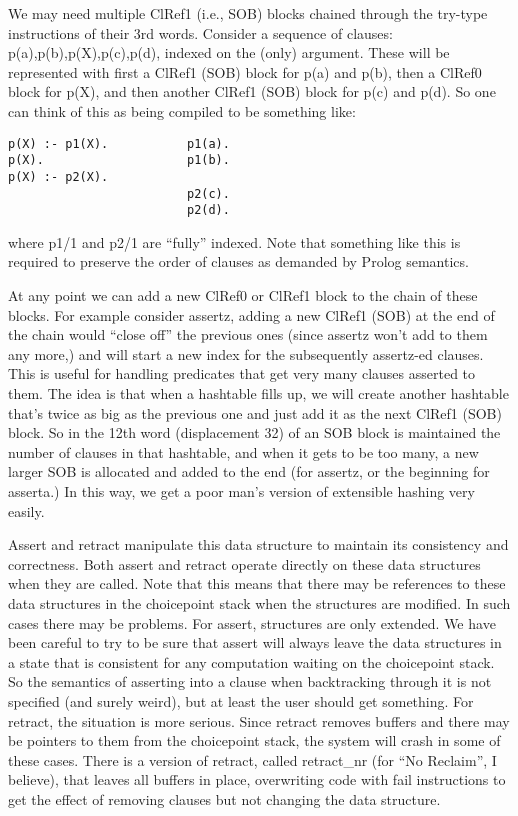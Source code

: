 \documentclass[11pt]{article}
\begin{document}
We may need multiple ClRef1 (i.e., SOB) blocks chained through the
try-type instructions of their 3rd words.  Consider a sequence of
clauses: p(a),p(b),p(X),p(c),p(d), indexed on the (only) argument.
These will be represented with first a ClRef1 (SOB) block for p(a) and
p(b), then a ClRef0 block for p(X), and then another ClRef1 (SOB)
block for p(c) and p(d).  So one can think of this as being compiled
to be something like:
\begin{verbatim}
p(X) :- p1(X).           p1(a).
p(X).                    p1(b).
p(X) :- p2(X).
                         p2(c).
                         p2(d).
\end{verbatim}
where p1/1 and p2/1 are ``fully'' indexed.  Note that something like
this is required to preserve the order of clauses as demanded by Prolog
semantics.

At any point we can add a new ClRef0 or ClRef1 block to the chain of
these blocks.  For example consider assertz, adding a new ClRef1 (SOB)
at the end of the chain would ``close off'' the previous ones (since
assertz won't add to them any more,) and will start a new index for the
subsequently assertz-ed clauses.  This is useful for handling
predicates that get very many clauses asserted to them.  The idea is
that when a hashtable fills up, we will create another hashtable
that's twice as big as the previous one and just add it as the next
ClRef1 (SOB) block.  So in the 12th word (displacement 32) of an SOB
block is maintained the number of clauses in that hashtable, and when
it gets to be too many, a new larger SOB is allocated and added to the
end (for assertz, or the beginning for asserta.)  In this way, we get
a poor man's version of extensible hashing very easily.

Assert and retract manipulate this data structure to maintain its
consistency and correctness.  Both assert and retract operate directly
on these data structures when they are called.  Note that this means
that there may be references to these data structures in the
choicepoint stack when the structures are modified.  In such cases
there may be problems.  For assert, structures are only extended.  We
have been careful to try to be sure that assert will always leave the
data structures in a state that is consistent for any computation
waiting on the choicepoint stack.  So the semantics of asserting into
a clause when backtracking through it is not specified (and surely
weird), but at least the user should get something.  For retract, the
situation is more serious.  Since retract removes buffers and there
may be pointers to them from the choicepoint stack, the system will
crash in some of these cases.  There is a version of retract, called
retract\_nr (for ``No Reclaim'', I believe), that leaves all buffers in
place, overwriting code with fail instructions to get the effect of
removing clauses but not changing the data structure.
\end{document}

